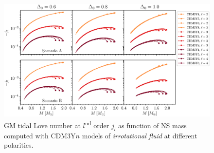 \begin{figure}[ht!]
        \centering
        \includegraphics[width=\textwidth]{fig/jl_irrot.eps}
        \caption{\gls{GM} tidal Love number at $l$\textsuperscript{nd} order $j_l$ as function of \gls{NS} mass computed with CDM3Y$n$ models of \emph{irrotational fluid} at different polarities.}
        \label{fig:jl_irrot}
\end{figure} 
